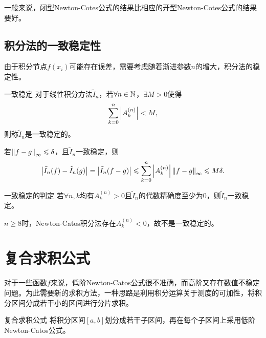 \begin{remark}
    一般来说，闭型Newton-Cotes公式的结果比相应的开型Newton-Cotes公式的结果要好。
\end{remark}

\subsection{积分法的一致稳定性}

由于积分节点$f(x_i)$可能存在误差，需要考虑随着渐进参数$n$的增大，积分法的稳定性。

\begin{definition}
    {一致稳定}{}
    对于线性积分方法$\tilde I_n$，若$\forall n\in\mathbb N$，$\exists M>0$使得
    \begin{equation}
        \sum_{k=0}^n\left\lvert A_k^{(n)}\right\rvert<M,
    \end{equation}
    则称$\tilde I_n$是一致稳定的。
\end{definition}

\begin{corollary}
    若$\left\lVert f-g\right\rVert_\infty\leqslant\delta$，且$\tilde I_n$一致稳定，则
    \[
        \left\lvert\tilde I_n(f)-\tilde I_n(g)\right\rvert=\left\lvert\tilde I_n(f-g)\right\rvert\leqslant\sum_{k=0}^n\left\lvert A_k^{(n)}\right\rvert\left\lVert f-g\right\rVert_\infty\leqslant M\delta.
    \]
\end{corollary}

\begin{theorem}
    {一致稳定的判定}{}
    若$\forall n,k$均有$A_k^{(n)}>0$且$\tilde I_n$的代数精确度至少为0，则$\tilde I_n$一致稳定。
\end{theorem}

\begin{remark}
    $n\geq 8$时，Newton-Catos积分法存在$A_k^{(n)}<0$，故不是一致稳定的。
\end{remark}

\section{复合求积公式}
\label{sec:composite quadrature rule}

对于一些函数$f$来说，低阶Newton-Catos公式很不准确，而高阶又存在数值不稳定问题。为此需要新的求积方法，一种思路是利用积分运算关于测度的可加性，将积分区间分成若干小的区间进行分片求积。

\begin{definition}
    {复合求积公式}{}
    将积分区间$[a,b]$划分成若干子区间，再在每个子区间上采用低阶Newton-Catos公式。
\end{definition}

